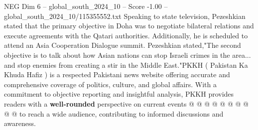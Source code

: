 \begin{textsample}{NEG Dim 6 – global\_south\_2024\_10 – Score -1.00 – global\_south\_2024\_10/115355552.txt}
Speaking to state television, Pezeshkian stated that the primary objective in Doha was to negotiate bilateral relations and execute agreements with the Qatari authorities.
Additionally, he is scheduled to attend an Asia Cooperation Dialogue summit.
Pezeshkian stated,"The second objective is to talk about how Asian nations can stop Israeli crimes in the area... and stop enemies from creating a stir in the Middle East."PKKH ( Pakistan Ka Khuda Hafiz ) is a respected Pakistani news website offering accurate and comprehensive coverage of politics, culture, and global affairs.
With a commitment to objective reporting and insightful analysis, PKKH provides readers with a \textbf{well-rounded} perspective on current events @ @ @ @ @ @ @ @ @ @ to reach a wide audience, contributing to informed discussions and awareness.

\end{textsample}
